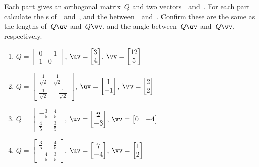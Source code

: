 \begin{exercise} \label{ex:preserve} 
Each part gives an orthogonal matrix~\(Q\) and two vectors~\uv\ and~\vv.  
For each part calculate the s of~\uv\ and~\vv, and the  between~\uv\ and~\vv.
Confirm these are the same as the lengths of~\(Q\uv\) and~\(Q\vv\), and the angle between~\(Q\uv\) and~\(Q\vv\), respectively.

\begin{enumerate}
\item \(Q=\begin{bmatrix} 0&-1\\1&0 \end{bmatrix}\), 
\(\uv=\begin{bmatrix} 3\\4 \end{bmatrix}\),
\(\vv=\begin{bmatrix} 12\\5 \end{bmatrix}\)

\item \(Q=\begin{bmatrix} \frac1{\sqrt2}&\frac1{\sqrt2}
\\\frac1{\sqrt2}&-\frac1{\sqrt2} \end{bmatrix}\), 
\(\uv=\begin{bmatrix} 1\\-1 \end{bmatrix}\),
\(\vv=\begin{bmatrix} 2\\2 \end{bmatrix}\)

\item \(Q=\begin{bmatrix} -\frac35&\frac45
\\\frac45&\frac35 \end{bmatrix}\), 
\(\uv=\begin{bmatrix} 2\\-3 \end{bmatrix}\),
\(\vv=\begin{bmatrix} 0&-4 \end{bmatrix}\)

\item \(Q=\begin{bmatrix} \frac35&\frac45
\\-\frac45&\frac35 \end{bmatrix}\), 
\(\uv=\begin{bmatrix} 7\\-4 \end{bmatrix}\),
\(\vv=\begin{bmatrix} 1\\2 \end{bmatrix}\)


\end{enumerate}
\end{exercise}

